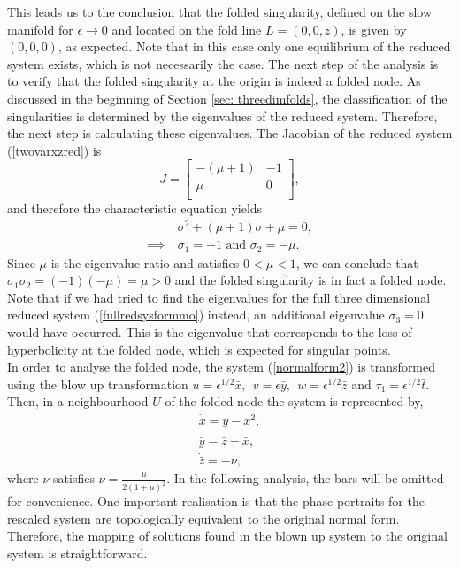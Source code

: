 This leads us to the conclusion that the folded singularity, defined on the slow manifold for $\epsilon \to 0$ and located on the fold line $L=(0,0,z)$, is given by $(0,0,0)$, as expected. Note that in this case only one equilibrium of the reduced system exists, which is not necessarily the case.
The next step of the analysis is to verify that the folded singularity at the origin is indeed a folded node.
As discussed in the beginning of Section \ref{sec: threedimfolds}, the classification of the singularities is determined by the eigenvalues of the reduced system. Therefore, the next step is calculating these eigenvalues.
The Jacobian of the reduced system (\ref{twovarxzred}) is
\begin{equation}
J=\begin{bmatrix}
-(\mu +1) & -1 \\
\mu & 0 \\
\end{bmatrix},
\end{equation}
and therefore the characteristic equation yields
\begin{align*}
&\sigma^2 +(\mu +1)\sigma + \mu = 0, \\
\implies \ &\sigma_1= -1 \textrm{\ \ \ and \ \ \ } \sigma_2 = -\mu.
\end{align*}
Since $\mu$ is the eigenvalue ratio and satisfies $0< \mu < 1$, we can conclude that $ \sigma_1\sigma_2 = (-1)(-\mu)=\mu >0 $
and the folded singularity is in fact a folded node. Note that if we had tried to find the eigenvalues for the full three dimensional reduced system (\ref{fullredsysformmo}) instead, an additional eigenvalue $\sigma_3=0$ would have occurred. This is the eigenvalue that corresponds to the loss of hyperbolicity at the folded node, which is expected for singular points.\\

In order to analyse the folded node, the system (\ref{normalform2}) is transformed using the blow up transformation $u= \epsilon^{1/2}\bar{x},\ \  v=\epsilon \bar{y}, \ \ w= \epsilon^{1/2} \bar{z}$ and $ \tau_1 = \epsilon^{1/2} \bar{t}$.
Then, in a neighbourhood $U$ of the folded node the system is represented by,
\begin{align*}
\dot{\bar{x}}= \bar{y} - \bar{x}^2,\\
\dot{\bar{y}}=\bar{z} - \bar{x}, \\
\dot{\bar{z}}= - \nu,
\end{align*}
where $\nu$ satisfies $\nu = \frac{\mu}{2(1+\mu)^2}$.
In the following analysis, the bars will be omitted for convenience.
One important realisation is that the phase portraits for the rescaled system are topologically equivalent to the original normal form. Therefore, the mapping of solutions  found in the blown up system to the original system is straightforward.\\

